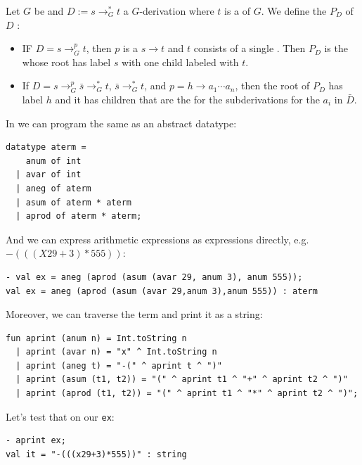 Let $G$ be  and $D := s \to_{G}^{*} t$ a $G$-derivation where $t$ is a  of $G$. We define the  $P_D$ of $D$ :
\begin{itemize}
\item IF $D = s \to_{G}^{p} t$, then $p$ is a   $s\to t$ and $t$ consists of a single . Then $P_D$ is the  whose root has label $s$ with one child labeled with $t$.
\item If $D = s \to_{G}^{p} \bar{s} \to_{G}^{*} t$, $\bar{s} \to_{G}^{*} t$, and $p = h \to a_1 \cdots a_n$, then the root of $P_D$ has label $h$ and it has children that are the  for the subderivations for the $a_i$ in $\bar{D}$.
\end{itemize}


In  we can program the same  as an abstract datatype:
\begin{verbatim}
datatype aterm =
    anum of int
  | avar of int
  | aneg of aterm
  | asum of aterm * aterm
  | aprod of aterm * aterm;
\end{verbatim}

And we can express arithmetic expressions as  expressions directly, e.g. $-(((X29+3) * 555))$:
\begin{verbatim}
- val ex = aneg (aprod (asum (avar 29, anum 3), anum 555));
val ex = aneg (aprod (asum (avar 29,anum 3),anum 555)) : aterm
\end{verbatim}

Moreover, we can traverse the term  and print it as a string:
\begin{verbatim}
fun aprint (anum n) = Int.toString n
  | aprint (avar n) = "x" ^ Int.toString n
  | aprint (aneg t) = "-(" ^ aprint t ^ ")"
  | aprint (asum (t1, t2)) = "(" ^ aprint t1 ^ "+" ^ aprint t2 ^ ")"
  | aprint (aprod (t1, t2)) = "(" ^ aprint t1 ^ "*" ^ aprint t2 ^ ")";
\end{verbatim}

Let's test that on our \texttt{ex}:
\begin{verbatim}
- aprint ex;
val it = "-(((x29+3)*555))" : string
\end{verbatim}

